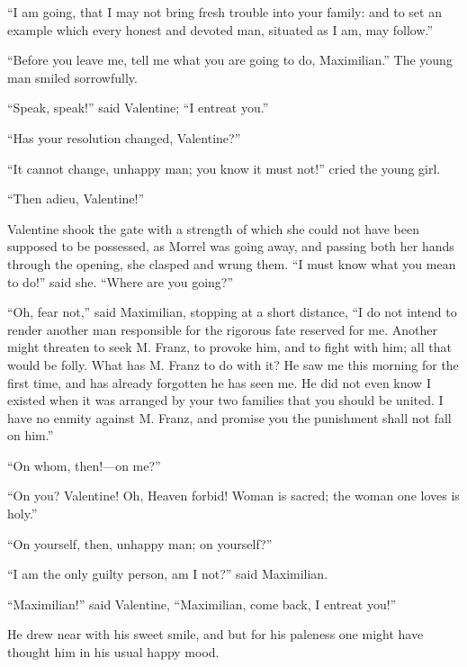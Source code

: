 “I am going, that I may not bring fresh trouble into your family: and
to set an example which every honest and devoted man, situated as I am,
may follow.”

“Before you leave me, tell me what you are going to do, Maximilian.”
The young man smiled sorrowfully.

“Speak, speak!” said Valentine; “I entreat you.”

“Has your resolution changed, Valentine?”

“It cannot change, unhappy man; you know it must not!” cried the young
girl.

“Then adieu, Valentine!”

Valentine shook the gate with a strength of which she could not have
been supposed to be possessed, as Morrel was going away, and passing
both her hands through the opening, she clasped and wrung them. “I must
know what you mean to do!” said she. “Where are you going?”

“Oh, fear not,” said Maximilian, stopping at a short distance, “I do
not intend to render another man responsible for the rigorous fate
reserved for me. Another might threaten to seek M. Franz, to provoke
him, and to fight with him; all that would be folly. What has M. Franz
to do with it? He saw me this morning for the first time, and has
already forgotten he has seen me. He did not even know I existed when
it was arranged by your two families that you should be united. I have
no enmity against M. Franz, and promise you the punishment shall not
fall on him.”

“On whom, then!—on me?”

“On you? Valentine! Oh, Heaven forbid! Woman is sacred; the woman one
loves is holy.”

“On yourself, then, unhappy man; on yourself?”

“I am the only guilty person, am I not?” said Maximilian.

“Maximilian!” said Valentine, “Maximilian, come back, I entreat you!”

He drew near with his sweet smile, and but for his paleness one might
have thought him in his usual happy mood.


